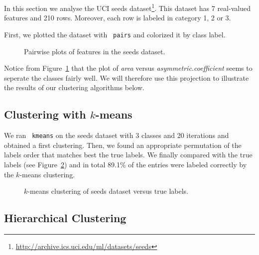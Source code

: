 \documentclass[12pt,article,oneside]{memoir}
\newcommand{\func}[1]{\texttt{\color{red} #1}}
\begin{document}
In this section we analyse the UCI seeds dataset\footnote{\url{http://archive.ics.uci.edu/ml/datasets/seeds}}. This dataset has 7 real-valued features and 210 rows. Moreover, each row is labeled in category 1, 2 or 3.

First, we plotted the dataset with \func{pairs} and colorized it by class label.
\begin{figure}[htb]
	\caption{Pairwise plots of features in the seeds dataset.}
	\label{fig:seeds-pairs}
\end{figure}

Notice from Figure~\ref{fig:seeds-pairs} that the plot of \emph{area} versus \emph{asymmetric.coefficient} seems to seperate the classes fairly well. We will therefore use this projection to illustrate the results of our clustering algorithms below.

\subsection{Clustering with $k$-means}

We ran \func{kmeans} on the seeds dataset with 3 classes and 20 iterations and obtained a first clustering. Then, we found an appropriate permutation of the labels order that matches best the true labels. We finally compared with the true labels (see Figure~\ref{fig:seeds-kmeans}) and in total 89.1\% of the entries were labeled correctly by the $k$-means clustering. 
\begin{figure}[H]
	\caption{$k$-means clustering of seeds dataset versus true labels.}
	\label{fig:seeds-kmeans}
\end{figure}

\subsection{Hierarchical Clustering}
\end{document}
